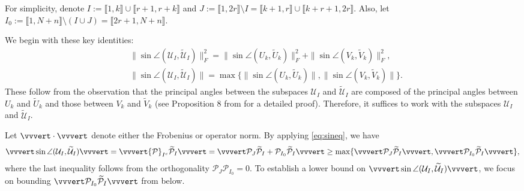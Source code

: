 \documentclass[reqno]{amsart}
\theoremstyle{plain}
\theoremstyle{definition}
\begin{document}
For simplicity, denote
$I:=\llbracket 1, k\rrbracket \cup \llbracket r+1, r+k\rrbracket$
and
$J:=\llbracket 1, 2r \rrbracket \setminus I =  \llbracket k+1, r\rrbracket  \cup  \llbracket k+r+1, 2r\rrbracket.$ Also, let $I_0:=\llbracket 1, N+n \rrbracket \setminus (I\cup J) = \llbracket 2r+1, N+n\rrbracket$.

We begin with these key identities:
\begin{align}
&\| \sin \angle (\mathcal U_{I}, \widetilde{\mathcal U}_{I}) \|_F^2 = \|\sin \angle ( U_{k}, \widetilde{ U}_{k})\|_F^2 + \|\sin \angle ( V_{k}, \widetilde{ V}_{k})\|_F^2,\label{eq:F-lowbd}\\
&\| \sin \angle (\mathcal U_{I}, \widetilde{\mathcal U}_{I}) \| = \max\{\|\sin \angle ( U_{k}, \widetilde{ U}_{k})\|, \|\sin \angle ( V_{k}, \widetilde{ V}_{k})\| \}.\label{eq:O-lowbd}
\end{align}
These follow from the observation that the principal angles between the subspaces $\mathcal U_{I}$ and $\widetilde{\mathcal U}_{I}$ are composed of the principal angles between $U_{k}$ and $\widetilde{ U}_{k}$ and those  between $V_{k}$ and $\widetilde{V}_{k}$ (see Proposition 8 from \cite{OVW22} for a detailed proof). Therefore, it suffices to work with the subspaces $\mathcal U_{I}$ and $\widetilde{\mathcal U}_{I}$. 

Let $\vvvert \cdot \vvvert$ denote either the Frobenius or operator norm. By applying \eqref{eq:sineq}, we have
\begin{align*}
\vvvert \sin \angle (\mathcal U_{I}, \widetilde{\mathcal U}_{I}) \vvvert =\vvvert {\mathcal P}_{I^c}  \widetilde{\mathcal P}_I \vvvert =\vvvert \mathcal P_{J} \widetilde{\mathcal P}_{I} + \mathcal P_{I_0} \widetilde{\mathcal P}_{I} \vvvert \ge \max\{\vvvert \mathcal P_{J} \widetilde{\mathcal P}_{I} \vvvert, \vvvert \mathcal P_{I_0} \widetilde{\mathcal P}_{I} \vvvert\},
\end{align*}
where the last inequality follows from the orthogonality $\mathcal P_{J} \mathcal P_{I_0}=0$. To establish a lower bound on $\vvvert \sin \angle (\mathcal U_{I}, \widetilde{\mathcal U}_{I}) \vvvert $, we focus on bounding $\vvvert \mathcal P_{I_0} \widetilde{\mathcal P}_{I} \vvvert$ from below.
\end{document}
